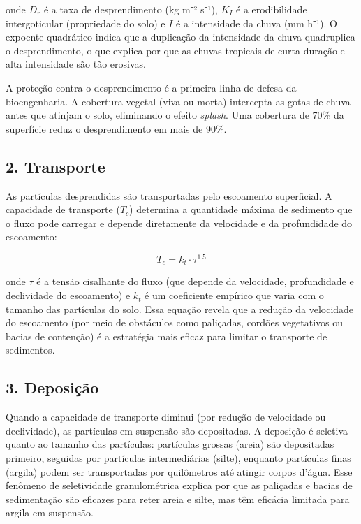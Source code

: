 \documentclass[
  portuguese,
  11pt,
  a4paper,
  open=any]{scrbook}
\begin{document}
onde \(D_r\) é a taxa de desprendimento (kg m⁻² s⁻¹), \(K_I\) é a
erodibilidade intergoticular (propriedade do solo) e \(I\) é a
intensidade da chuva (mm h⁻¹). O expoente quadrático indica que a
duplicação da intensidade da chuva quadruplica o desprendimento, o que
explica por que as chuvas tropicais de curta duração e alta intensidade
são tão erosivas.

A proteção contra o desprendimento é a primeira linha de defesa da
bioengenharia. A cobertura vegetal (viva ou morta) intercepta as gotas
de chuva antes que atinjam o solo, eliminando o efeito \emph{splash}.
Uma cobertura de 70\% da superfície reduz o desprendimento em mais de
90\%.

\subsection{2. Transporte}\label{transporte}

As partículas desprendidas são transportadas pelo escoamento
superficial. A capacidade de transporte (\(T_c\)) determina a quantidade
máxima de sedimento que o fluxo pode carregar e depende diretamente da
velocidade e da profundidade do escoamento:

\[
T_c = k_t \cdot \tau^{1.5}
\]

onde \(\tau\) é a tensão cisalhante do fluxo (que depende da velocidade,
profundidade e declividade do escoamento) e \(k_t\) é um coeficiente
empírico que varia com o tamanho das partículas do solo. Essa equação
revela que a redução da velocidade do escoamento (por meio de obstáculos
como paliçadas, cordões vegetativos ou bacias de contenção) é a
estratégia mais eficaz para limitar o transporte de sedimentos.

\subsection{3. Deposição}\label{deposiuxe7uxe3o}

Quando a capacidade de transporte diminui (por redução de velocidade ou
declividade), as partículas em suspensão são depositadas. A deposição é
seletiva quanto ao tamanho das partículas: partículas grossas (areia)
são depositadas primeiro, seguidas por partículas intermediárias
(silte), enquanto partículas finas (argila) podem ser transportadas por
quilômetros até atingir corpos d'água. Esse fenômeno de seletividade
granulométrica explica por que as paliçadas e bacias de sedimentação são
eficazes para reter areia e silte, mas têm eficácia limitada para argila
em suspensão.
\end{document}
